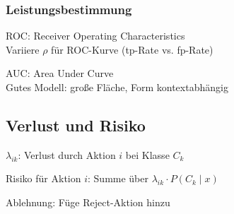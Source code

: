 \subsubsection*{Leistungsbestimmung}
ROC: Receiver Operating Characteristics \\
Variiere $\rho$ für ROC-Kurve (tp-Rate vs. fp-Rate)

AUC: Area Under Curve \\
Gutes Modell: große Fläche, Form kontextabhängig

\subsection*{Verlust und Risiko}
$\lambda_{ik}$: Verlust durch Aktion $i$ bei Klasse $C_k$

Risiko für Aktion $i$: Summe über $\lambda_{ik}\cdot P(C_k \mid x)$

Ablehnung: Füge Reject-Aktion hinzu
